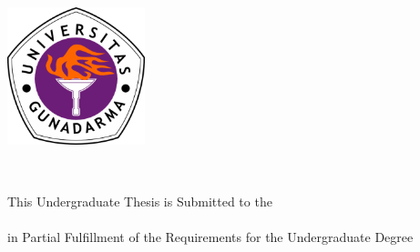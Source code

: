 \cleardoublepage
{}

\begin{titlepage}

\begin{adjustwidth}{0cm}{0cm}
\begin{center}

\large

\hfill

\vfill

\begingroup
{\LARGE
\color{RoyalPurple}{\myUni} \\
\myFacultyLong \\
}
\endgroup

\vfill

\includegraphics[width=4cm]{include/gunadarma-logo} \\ \medskip

\vfill

{\LARGE
\myTitleLineOne\\
\myTitleLineTwo
}

\vfill


This Undergraduate Thesis is Submitted to the \\
\myFacultyLong \xspace \myUni \xspace \\
in Partial Fulfillment of the Requirements for the Undergraduate Degree

\bigskip

\myLocation \\
\myTime \\

\vfill

\end{center}
\end{adjustwidth}

\end{titlepage}
